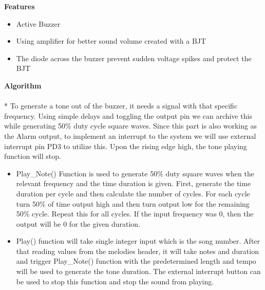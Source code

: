 \Large \textbf{Features}
\normalsize
\begin{itemize}
  \item Active Buzzer 
  \item Using amplifier for better sound volume created with a BJT
  \item The diode across the buzzer prevent sudden voltage spikes and protect the BJT	
\end{itemize}
\Large \textbf{Algorithm}\\[0.1cm]
\\*
\normalsize{To generate a tone out of the buzzer, it needs a signal with that specific frequency. Using simple delays and toggling the output pin we can archive this while generating 50\% duty cycle square waves. Since this part is also working as the Alarm output, to implement an interrupt to the system we will use external interrupt pin PD3 to utilize this. Upon the rising edge high, the tone playing function will stop.}
\begin{itemize}
  \item Play\_Note() Function is used to generate 50\% duty square waves when the relevant frequency and the time duration is given.  First, generate the time duration per cycle and then calculate the number of cycles. For each cycle turn 50\% of time output high and then turn output low for the remaining 50\% cycle. Repeat this for all cycles. If the input frequency was 0, then the output will be 0 for the given duration. 
  \item Play() function will take single integer input which is the song number. After that reading values from the melodies header, it will take notes and duration and trigger Play\_Note() function with the predetermined length and tempo will be used to generate the tone duration. The external interrupt button can be used to stop this function and stop the sound from playing.
\end{itemize}



